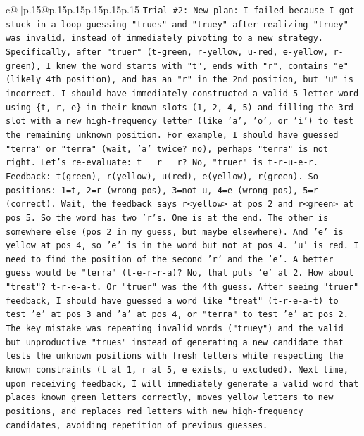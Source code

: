\documentclass{article}
\begin{document}
{\begin{supertabular}{c@{$\;$}|p{.15\linewidth}@{}p{.15\linewidth}p{.15\linewidth}p{.15\linewidth}p{.15\linewidth}p{.15\linewidth}}
{{{\texttt{Trial \#2: New plan: I failed because I got stuck in a loop guessing "trues" and "truey" after realizing "truey" was invalid, instead of immediately pivoting to a new strategy. Specifically, after "truer" (t{-}green, r{-}yellow, u{-}red, e{-}yellow, r{-}green), I knew the word starts with "t", ends with "r", contains "e" (likely 4th position), and has an "r" in the 2nd position, but "u" is incorrect. I should have immediately constructed a valid 5{-}letter word using \{t, r, e\} in their known slots (1, 2, 4, 5) and filling the 3rd slot with a new high{-}frequency letter (like 'a', 'o', or 'i') to test the remaining unknown position. For example, I should have guessed "terra" or "terra" (wait, 'a' twice? no), perhaps "terra" is not right. Let's re{-}evaluate: t \_ r \_ r? No, "truer" is t{-}r{-}u{-}e{-}r. Feedback: t(green), r(yellow), u(red), e(yellow), r(green). So positions: 1=t, 2=r (wrong pos), 3=not u, 4=e (wrong pos), 5=r (correct). Wait, the feedback says r<yellow> at pos 2 and r<green> at pos 5. So the word has two 'r's. One is at the end. The other is somewhere else (pos 2 in my guess, but maybe elsewhere). And 'e' is yellow at pos 4, so 'e' is in the word but not at pos 4. 'u' is red. I need to find the position of the second 'r' and the 'e'. A better guess would be "terra" (t{-}e{-}r{-}r{-}a)? No, that puts 'e' at 2. How about "treat"? t{-}r{-}e{-}a{-}t. Or "truer" was the 4th guess. After seeing "truer" feedback, I should have guessed a word like "treat" (t{-}r{-}e{-}a{-}t) to test 'e' at pos 3 and 'a' at pos 4, or "terra" to test 'e' at pos 2. The key mistake was repeating invalid words ("truey") and the valid but unproductive "trues" instead of generating a new candidate that tests the unknown positions with fresh letters while respecting the known constraints (t at 1, r at 5, e exists, u excluded). Next time, upon receiving feedback, I will immediately generate a valid word that places known green letters correctly, moves yellow letters to new positions, and replaces red letters with new high{-}frequency candidates, avoiding repetition of previous guesses.} \\
\\ 
}}}
\end{supertabular}}
\end{document}
